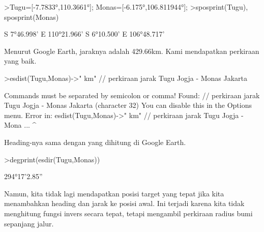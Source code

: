 \documentclass[12pt,arial,letterpaper]{book}
\begin{document}
\begin{eulercomment}
\begin{eulercomment}
\begin{eulercomment}
\begin{eulercomment}
\begin{eulercomment}
\begin{eulercomment}
\begin{eulercomment}
\begin{eulercomment}
\begin{eulercomment}
\begin{eulercomment}
\begin{eulercomment}
\begin{eulercomment}
\begin{eulercomment}
\begin{eulercomment}
\begin{eulercomment}
\begin{eulercomment}
\begin{eulercomment}
\begin{eulercomment}
\begin{eulercomment}
\begin{eulercomment}
\begin{eulercomment}
\begin{eulercomment}
\begin{eulercomment}
\begin{eulercomment}
\begin{eulercomment}
\begin{eulercomment}
\begin{eulercomment}
\begin{eulercomment}
\begin{eulercomment}
\begin{eulercomment}
\begin{eulercomment}
\end{eulercomment}
\begin{eulerprompt}
>Tugu=[-7.7833°,110.3661°]; Monas=[-6.175°,106.811944°];
>sposprint(Tugu), sposprint(Monas)
\end{eulerprompt}
\begin{euleroutput}
  S 7°46.998' E 110°21.966'
  S 6°10.500' E 106°48.717'
\end{euleroutput}
\begin{eulercomment}
Menurut Google Earth, jaraknya adalah 429.66km. Kami mendapatkan
perkiraan yang baik.
\end{eulercomment}
\begin{eulerprompt}
>esdist(Tugu,Monas)->" km" // perkiraan jarak Tugu Jogja - Monas Jakarta
\end{eulerprompt}
\begin{euleroutput}
  Commands must be separated by semicolon or comma!
  Found:  // perkiraan jarak Tugu Jogja - Monas Jakarta (character 32)
  You can disable this in the Options menu.
  Error in:
  esdist(Tugu,Monas)->" km" // perkiraan jarak Tugu Jogja - Mona ...
                           ^
\end{euleroutput}
\begin{eulercomment}
Heading-nya sama dengan yang dihitung di Google Earth.
\end{eulercomment}
\begin{eulerprompt}
>degprint(esdir(Tugu,Monas))
\end{eulerprompt}
\begin{euleroutput}
  294°17'2.85''
\end{euleroutput}
\begin{eulercomment}
Namun, kita tidak lagi mendapatkan posisi target yang tepat jika kita
menambahkan heading dan jarak ke posisi awal. Ini terjadi karena kita
tidak menghitung fungsi invers secara tepat, tetapi mengambil
perkiraan radius bumi sepanjang jalur.
\end{eulercomment}
\begin{eulerprompt}

\end{eulerprompt}
\end{eulercomment}
\end{eulercomment}
\end{eulercomment}
\end{eulercomment}
\end{eulercomment}
\end{eulercomment}
\end{eulercomment}
\end{eulercomment}
\end{eulercomment}
\end{eulercomment}
\end{eulercomment}
\end{eulercomment}
\end{eulercomment}
\end{eulercomment}
\end{eulercomment}
\end{eulercomment}
\end{eulercomment}
\end{eulercomment}
\end{eulercomment}
\end{eulercomment}
\end{eulercomment}
\end{eulercomment}
\end{eulercomment}
\end{eulercomment}
\end{eulercomment}
\end{eulercomment}
\end{eulercomment}
\end{eulercomment}
\end{eulercomment}
\end{eulercomment}
\end{document}

